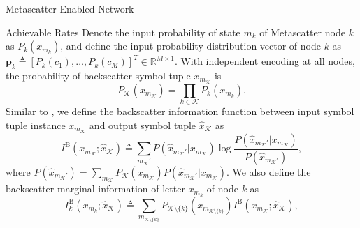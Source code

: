 \documentclass[journal]{IEEEtran}
\begin{document}
\begin{section}{Metascatter-Enabled Network}
	\begin{subsection}{Achievable Rates}
		Denote the input probability of state $m_k$ of Metascatter node $k$ as $P_k(x_{m_k})$, and define the input probability distribution vector of node $k$ as $\boldsymbol{p}_k \triangleq [P_k(c_1),\ldots,P_k(c_M)]^T \in \mathbb{R}^{M \times 1}$. With independent encoding at all nodes, the probability of backscatter symbol tuple $x_{m_{\mathcal{K}}}$ is
		\begin{equation}
			P_{\mathcal{K}}(x_{m_{\mathcal{K}}}) = \prod_{k \in \mathcal{K}} P_k(x_{m_k}).
			\label{eq:equivalent_distribution}
		\end{equation}
		Similar to \cite{Rezaeian2004}, we define the backscatter information function between input symbol tuple instance $x_{m_{\mathcal{K}}}$ and output symbol tuple $\hat{x}_{\mathcal{K}}$ as
		\begin{equation}
			I^{\mathrm{B}}(x_{m_{\mathcal{K}}};\hat{x}_{\mathcal{K}}) \triangleq \sum_{m_{\mathcal{K}}'} P(\hat{x}_{m_{\mathcal{K}}'}|x_{m_{\mathcal{K}}}) \log \frac{P(\hat{x}_{m_{\mathcal{K}}'}|x_{m_{\mathcal{K}}})}{P(\hat{x}_{m_{\mathcal{K}}'})},
			\label{eq:backscatter_information_function}
		\end{equation}
		where $P(\hat{x}_{m_{\mathcal{K}}'}) = \sum_{m_{\mathcal{K}}} P_{\mathcal{K}}(x_{m_{\mathcal{K}}}) P(\hat{x}_{m_{\mathcal{K}}'}|x_{m_{\mathcal{K}}})$.
		We also define the backscatter marginal information of letter $x_{m_k}$ of node $k$ as
		\begin{equation}
			I^{\mathrm{B}}_{k}(x_{m_k};\hat{x}_{\mathcal{K}}) \triangleq \sum_{m_{\mathcal{K} \setminus \{k\}}} P_{\mathcal{K} \setminus \{k\}}(x_{m_{\mathcal{K} \setminus \{k\}}}) I^{\mathrm{B}}(x_{m_{\mathcal{K}}};\hat{x}_{\mathcal{K}}),

\end{equation}
\end{subsection}
\end{section}
\end{document}
